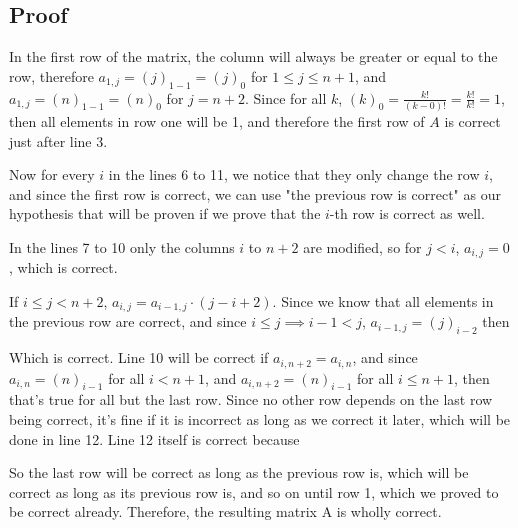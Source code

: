 \documentclass[a4paper, 10pt]{article}
\begin{document}
\subsection{Proof}

In the first row of the matrix, the column will always be greater or equal to the row, therefore
$a_{1,j} = (j)_{1-1} = (j)_0$ for $1 \leq j \leq n+1$, and $a_{1,j} = (n)_{1-1} = (n)_0$ for $j = n+2$.
Since for all $k$, $(k)_0 = \frac{k!}{(k - 0 )!} = \frac{k!}{k!} = 1$, then all elements in row one
will be 1, and therefore the first row of $A$ is correct just after line 3.

Now for every $i$ in the lines 6 to 11, we notice that they only change the row $i$, and since
the first row is correct, we can use "the previous row is correct" as our hypothesis that will
be proven if we prove that the $i$-th row is correct as well.

In the lines 7 to 10 only the columns $i$ to $n + 2$ are modified, so for $j < i$, $a_{i,j} = 0$,
which is correct.

If $i \leq j < n + 2$, $a_{i,j} = a_{i-1, j} \cdot (j - i + 2)$. Since we know that all
elements in the previous row are correct, and since $i \leq j \implies i - 1 < j$,
$a_{i-1, j} = (j)_{i-2}$ then

\algorithmIthRow

Which is correct. Line 10 will be correct if $a_{i,n+2} = a_{i,n}$, and since $a_{i,n} = (n)_{i-1}$
for all $i < n+1$, and $a_{i,n+2} = (n)_{i-1}$ for all $i \leq n+1$, then that's true for all
but the last row.  Since no other row depends on the last row being correct, it's fine if it is
incorrect as long as we correct it later, which will be done in line 12. Line 12 itself is
correct because
\algorithmLast

So the last row will be correct as long as the previous row is, which will be correct as long as its previous row is, and so on until row 1, which we proved to be correct already. Therefore, the resulting
matrix A is wholly correct.
\end{document}
